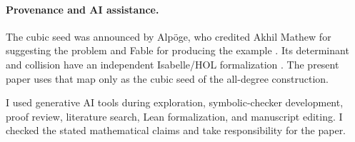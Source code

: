 \paragraph{Provenance and AI assistance.}
The cubic seed was announced by Alp\"oge, who credited Akhil Mathew for
suggesting the problem and Fable for producing the example \cite{Alpoge}.
Its determinant and collision have an independent Isabelle/HOL formalization
\cite{IsabelleAFP}.  The present paper uses that map only as the cubic seed
of the all-degree construction.

I used generative AI tools during exploration, symbolic-checker development,
proof review, literature search, Lean formalization, and manuscript editing.
I checked the stated mathematical claims and take responsibility for the
paper.
